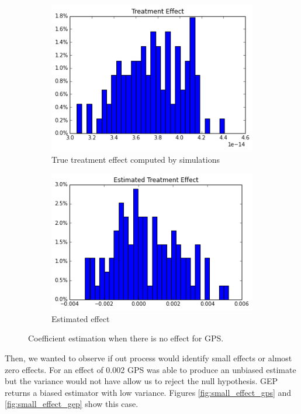 \documentclass[11pt]{article}
\begin{document}
\begin{figure}[h]
\centering
\begin{subfigure}{.5\textwidth}
  \centering
  \includegraphics[width=.9\linewidth]{treatment_effect_no_influence_real.png}
  \caption{True treatment effect computed by simulations}
  \label{fig:sub1}
\end{subfigure}%
\begin{subfigure}{.5\textwidth}
  \centering
  \includegraphics[width=.9\linewidth]{estimated_no_influence_gep.png}
  \caption{Estimated effect}
  \label{fig:sub2}
\end{subfigure}
\caption{Coefficient estimation when there is no effect for GPS.}
\label{fig:no_effect_gps}
\end{figure}

Then, we  wanted to observe if out process would identify small effects or almost zero effects. For an effect of 0.002 GPS was able to produce an unbiased estimate but the variance would not have allow us to reject the null hypothesis. GEP returns a biased estimator with low variance. Figures \ref{fig:small_effect_gps} and \ref{fig:small_effect_gep} show this case. 
\end{document}
